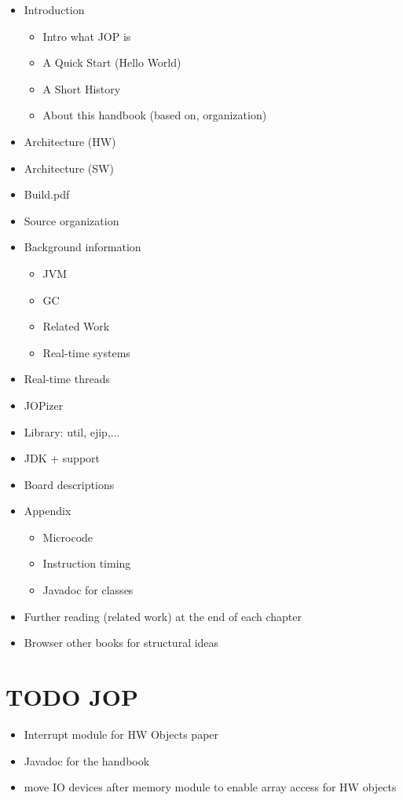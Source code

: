 \begin{itemize}
    \item Introduction
    \begin{itemize}
        \item Intro what JOP is
        \item A Quick Start (Hello World)
        \item A Short History
        \item About this handbook (based on, organization)
    \end{itemize}
    \item Architecture (HW)
    \item Architecture (SW)
    \item Build.pdf
    \item Source organization
    \item Background information
    \begin{itemize}
        \item JVM
        \item GC
        \item Related Work
        \item Real-time systems
    \end{itemize}
    \item Real-time threads
    \item JOPizer
    \item Library: util, ejip,...
    \item JDK + support
    \item Board descriptions
    \item Appendix
    \begin{itemize}
        \item Microcode
        \item Instruction timing
        \item Javadoc for classes
    \end{itemize}
    \item Further reading (related work) at the end of each chapter
    \item Browser other books for structural ideas
\end{itemize}

\section{TODO JOP}

\begin{itemize}
    \item Interrupt module for HW Objects paper
    \item Javadoc for the handbook
    \item move IO devices after memory module to enable array access
    for HW objects
\end{itemize}
